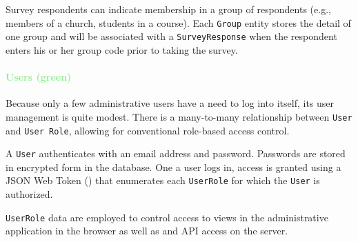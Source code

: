 \documentclass{article}
\begin{document}
Survey respondents can indicate membership in a group of respondents
(e.g., members of a church, students in a course).
Each \texttt{Group} entity stores the detail of one group
and will be associated with a \texttt{SurveyResponse}
when the respondent enters his or her group code
prior to taking the survey.

\paragraph{\textcolor{LightGreen}{Users (green)}}

Because only a few administrative users have a need to log into \caper{} itself,
its user management is quite modest.
There is a many-to-many relationship between \texttt{User} and \texttt{User Role},
allowing for conventional role-based access control.

A \texttt{User} authenticates with an email address and password.
Passwords are stored in encrypted form in the database.
One a user logs in,
access is granted using a
JSON Web Token (\jwt)
that enumerates each \texttt{UserRole} for which the \texttt{User} is authorized.

\texttt{UserRole} data are employed to control access to views
in the administrative application in the browser
as well as \gql{} and \rest{} API access on the server.
\end{document}
